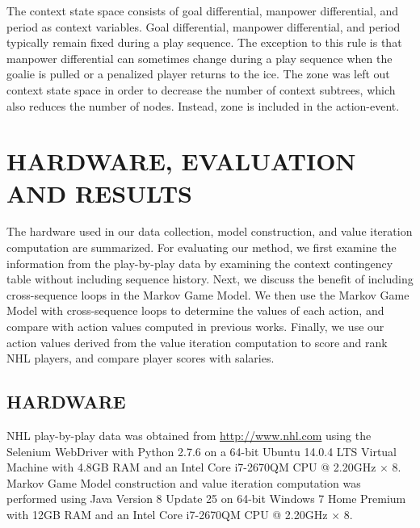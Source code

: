 \documentclass[]{article}
\begin{document}
The context state space consists of goal differential, manpower differential, and period as context variables. Goal differential, manpower differential, and period typically remain fixed during a play sequence. The exception to this rule is that manpower differential can sometimes change during a play sequence when the goalie is pulled or a penalized player returns to the ice. The zone was left out context state space in order to decrease the number of context subtrees, which also reduces the number of nodes. Instead, zone is included in the action-event. %


\section{HARDWARE, EVALUATION AND RESULTS}

The hardware used in our data collection, model construction, and value iteration computation are summarized. For evaluating our method, we first examine the information from the play-by-play data by examining the context contingency table without including sequence history. Next, we discuss the benefit of including cross-sequence loops in the Markov Game Model. We then use the Markov Game Model with cross-sequence loops to determine the values of each action, and compare with action values computed in previous works. Finally, we use our action values derived from the value iteration computation to score and rank NHL players, and compare player scores with salaries.

\subsection{HARDWARE}

NHL play-by-play data was obtained from \url{http://www.nhl.com} using the Selenium WebDriver with Python 2.7.6 \citep{Salunke2014} on a 64-bit Ubuntu 14.0.4 LTS Virtual Machine with 4.8GB RAM and an Intel Core i7-2670QM CPU @ 2.20GHz $\times$ 8. Markov Game Model construction and value iteration computation was performed using Java Version 8 Update 25 on 64-bit Windows 7 Home Premium with 12GB RAM and an Intel Core i7-2670QM CPU @ 2.20GHz $\times$ 8.
\end{document}

